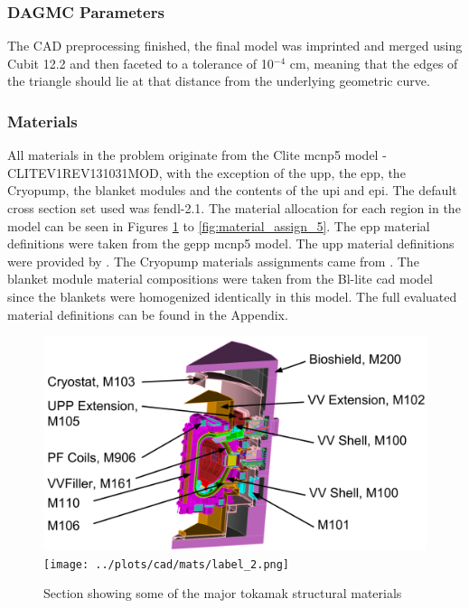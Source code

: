 \documentclass[12pt]{article}
\begin{document}
\subsubsection{DAGMC Parameters}
The CAD preprocessing finished, the final model was imprinted and merged using
Cubit 12.2 and then faceted to a tolerance of 10$^{-4}$ cm, meaning that the
edges of the triangle should lie at that distance from the underlying geometric
curve.
\newpage
\clearpage
\subsubsection{Materials}
All materials in the problem originate from the Clite \gls{mcnp5} model -
CLITE\textunderscore V1\textunderscore REV131031\textunderscore MOD, with the
exception of the \gls{upp}, the \gls{epp}, the
Cryopump, the blanket modules and the contents of the \gls{upi} and \gls{epi}.
The default cross section set used was \gls{fendl}-2.1. The material allocation
for each region in the model can be seen in Figures \ref{fig:material_assign_1} 
to \ref{fig:material_assign_5}. The \gls{epp} material 
definitions were taken from the \gls{gepp} \gls{mcnp5} model\cite{epp_materials}.
The \gls{upp} material definitions were provided by 
\cite{bertalot_communication}. The Cryopump materials assignments
came from \cite{cryopump_communication}. The blanket module material
compositions were taken from the Bl-lite \gls{cad} model since the blankets were
homogenized identically in this model. The full evaluated material definitions
can be found in the Appendix.
\begin{figure}[p]
  \centering
  \includegraphics[scale=0.32]{../plots/cad/mats/label_1.png}
  \texttt{[image: ../plots/cad/mats/label\_2.png]}
  \caption{Section showing some of the major tokamak structural materials}
  \label{fig:material_assign_1}
\end{figure}
\end{document}
